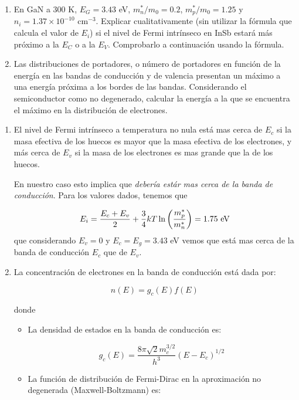 \begin{texercise}
	\begin{enumerate}[label=\alph*)]
		\item En GaN a 300 K, $E_G = 3.43$ eV, $m_n^*/m_0 = 0.2$, $m_p^*/m_0 = 1.25$ y $n_i = 1.37 \times 10^{-10} \text{ cm}^{-3}$. Explicar cualitativamente (sin utilizar la fórmula que calcula el valor de $E_i$) si el nivel de Fermi intrínseco en InSb estará más próximo a la $E_C$ o a la $E_V$. Comprobarlo a continuación usando la fórmula.
		
		\item Las distribuciones de portadores, o número de portadores en función de la energía en las bandas de conducción y de valencia presentan un máximo a una energía próxima a los bordes de las bandas. Considerando el semiconductor como no degenerado, calcular la energía a la que se encuentra el máximo en la distribución de electrones.
	\end{enumerate}
	\tcblower
	\begin{enumerate}[label=\alph*)]
		\item El nivel de Fermi intrínseco a temperatura no nula está mas cerca de $E_c$ si la masa efectiva de los huecos es mayor que la masa efectiva de los electrones, y más cerca de $E_v$ si la masa de los electrones es mas grande que la de los huecos. 
		
		En nuestro caso esto implica que \textit{debería estár mas cerca de la banda de conducción}. Para los valores dados, tenemos que

		\begin{equation}
			E_i = \frac{E_c+E_v}{2} + \frac{3}{4} kT \ln\left( \frac{m_p^*}{m_n^*} \right) = 1.75 \ \text{eV}
		\end{equation}
		que considerando $E_v=0$ y $E_c=E_g=3.43$ eV vemos que está mas cerca de la banda de conducción $E_c$ que de $E_v$.
		\item La concentración de electrones en la banda de conducción está dada por:

		\[
		n(E) = g_c(E) f(E)
		\]

		donde 

		\begin{itemize}
			\item La densidad de estados en la banda de conducción es:
		
		  \[
		  g_c(E) = \frac{8\pi \sqrt{2} m_c^{3/2}}{h^3} (E - E_c)^{1/2}
		  \]
		
			\item La función de distribución de Fermi-Dirac en la aproximación no degenerada (Maxwell-Boltzmann) es:
		

\end{itemize}
\end{enumerate}
\end{texercise}
